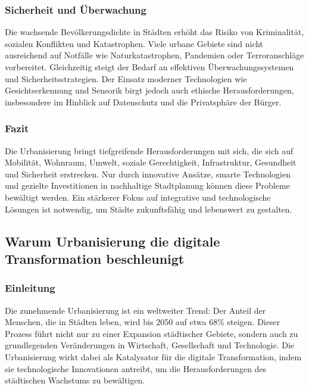 \documentclass[conference,compsoc,final,a4paper, onecolumn, 11pt]{IEEEtran}
\begin{document}
\subsubsection{ Sicherheit und Überwachung}
Die wachsende Bevölkerungsdichte in Städten erhöht das Risiko von Kriminalität, sozialen Konflikten und Katastrophen. 
Viele urbane Gebiete sind nicht ausreichend auf Notfälle wie Naturkatastrophen, Pandemien oder Terroranschläge vorbereitet. 
Gleichzeitig steigt der Bedarf an effektiven Überwachungssystemen und Sicherheitsstrategien. 
Der Einsatz moderner Technologien wie Gesichtserkennung und Sensorik birgt jedoch auch ethische Herausforderungen, insbesondere im Hinblick auf Datenschutz und die Privatsphäre der Bürger.\autocite{mckinsey_smart_cities}


\subsubsection{Fazit}
Die Urbanisierung bringt tiefgreifende Herausforderungen mit sich, die sich auf Mobilität, Wohnraum, Umwelt, soziale Gerechtigkeit, Infrastruktur, Gesundheit und Sicherheit erstrecken. 
Nur durch innovative Ansätze, smarte Technologien und gezielte Investitionen in nachhaltige Stadtplanung können diese Probleme bewältigt werden. 
Ein stärkerer Fokus auf integrative und technologische Lösungen ist notwendig, um Städte zukunftsfähig und lebenswert zu gestalten.


\subsection{Warum Urbanisierung die digitale Transformation beschleunigt}
\subsubsection{Einleitung}
Die zunehmende Urbanisierung ist ein weltweiter Trend: Der Anteil der Menschen, die in Städten leben, wird bis 2050 auf etwa 68\% steigen. 
Dieser Prozess führt nicht nur zu einer Expansion städtischer Gebiete, sondern auch zu grundlegenden Veränderungen in Wirtschaft, Gesellschaft und Technologie. 
Die Urbanisierung wirkt dabei als Katalysator für die digitale Transformation, indem sie technologische Innovationen antreibt, um die Herausforderungen des städtischen Wachstums zu bewältigen.
 
\end{document}
